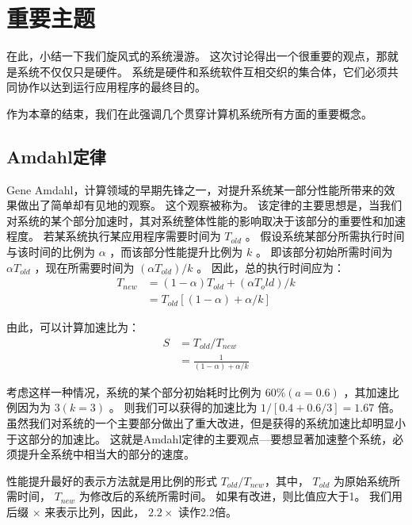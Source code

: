 \section{重要主题}
{
    在此，小结一下我们旋风式的系统漫游。
    这次讨论得出一个很重要的观点，那就是系统不仅仅只是硬件。
    系统是硬件和系统软件互相交织的集合体，它们必须共同协作以达到运行应用程序的最终目的。

    作为本章的结束，我们在此强调几个贯穿计算机系统所有方面的重要概念。

    \subsection{Amdahl定律}
    {
        Gene Amdahl，计算领域的早期先锋之一，对提升系统某一部分性能所带来的效果做出了简单却有见地的观察。
        这个观察被称为。
        该定律的主要思想是，当我们对系统的某个部分加速时，其对系统整体性能的影响取决于该部分的重要性和加速程度。
        若某系统执行某应用程序需要时间为 $T_{old}$ 。
        假设系统某部分所需执行时间与该时间的比例为 $\alpha$ ，而该部分性能提升比例为 $k$ 。
        即该部分初始所需时间为 $\alpha T_{old}$ ，现在所需要时间为 $(\alpha T_{old}) / k$ 。
        因此，总的执行时间应为：
        \begin{align*}
            T_{new} &= (1 - \alpha)T_{old} + (\alpha T_old) / k \\
            &= T_{old} [(1 - \alpha) + \alpha / k]
        \end{align*}

        由此，可以计算加速比为：
        \begin{align*}
            S &= T_{old} / T_{new} \\
            &= \frac{1}{(1 - \alpha) + \alpha / k}
        \end{align*}

        考虑这样一种情况，系统的某个部分初始耗时比例为 $60 \% (a = 0.6)$ ，其加速比例因为为 $3(k = 3)$ 。
        则我们可以获得的加速比为 $1 / [0.4 + 0.6 / 3] = 1.67$ 倍。
        虽然我们对系统的一个主要部分做出了重大改进，但是获得的系统加速比却明显小于这部分的加速比。
        这就是Amdahl定律的主要观点---要想显著加速整个系统，必须提升全系统中相当大的部分的速度。

        \begin{sidenote}[表示相对性能]
            性能提升最好的表示方法就是用比例的形式 $T_{old} / T_{new}$，其中， $T_{old}$ 为原始系统所需时间， $T_{new}$ 为修改后的系统所需时间。
            如果有改进，则比值应大于1。
            我们用后缀 $\times$ 来表示比列，因此， $2.2 \times$ 读作2.2倍。


\end{sidenote}}}
